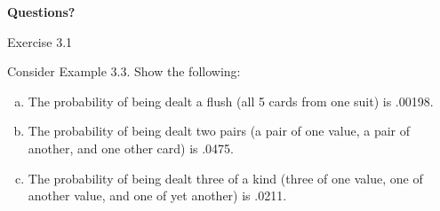 \documentclass[aspectratio=169,xcolor=pdftex,dvipsnames,table]{beamer}\usepackage[]{graphicx}\usepackage[]{xcolor}
\begin{document}
\begin{frame}
  \begin{center}
    \Large{\textbf{Questions?}}
  \end{center}
\end{frame}

\begin{frame}{Exercise 3.1}

Consider Example 3.3. Show the following:

\begin{enumerate}[a)]
\item The probability of being dealt a flush (all 5 cards from one suit) is .00198.
\item The probability of being dealt two pairs (a pair of one value, a pair of another, and one other card) is .0475.
\item The probability of being dealt three of a kind (three of one value, one of another value, and one of yet another) is .0211.
\end{enumerate}
\end{frame}
\end{document}
